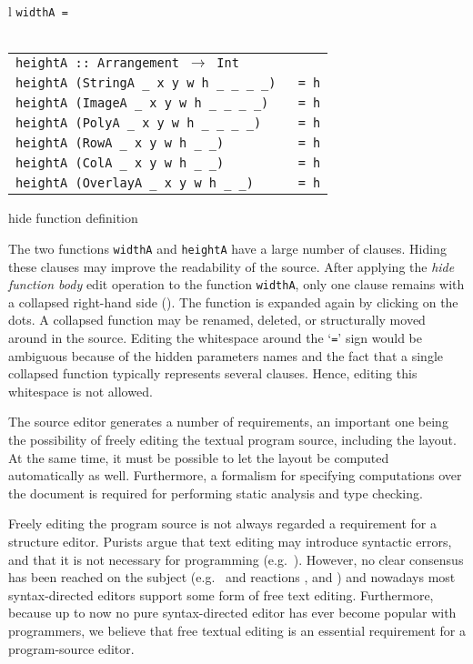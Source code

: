 \documentclass{speauth}
\newcommand{\p}[1]{\texttt{#1}}
\begin{document}
{\begin{tabular}[t]{l}
{\tt widthA = \framebox{\rule{0cm}{1.5ex}\dots}}\\
\\
\begin{tabular}[t]{@{}l@{}l}
{\tt heightA :: Arrangement $\rightarrow$ Int}\\
{\tt heightA (StringA \_ x y w h \_ \_ \_ \_)}&\p{ = h}\\
{\tt heightA (ImageA \_ x y w h \_ \_ \_ \_)}&\p{ = h}\\
{\tt heightA (PolyA \_ x y w h \_ \_ \_ \_)}&\p{ = h}\\
{\tt heightA (RowA \_ x y w h \_ \_)}&\p{ = h}\\
{\tt heightA (ColA \_ x y w h \_ \_)}&\p{ = h}\\
{\tt heightA (OverlayA \_ x y w h \_ \_)}&\p{ = h}
\end{tabular}
\end{tabular}
}{\small hide function definition}

The two functions \verb|widthA| and \verb|heightA| have a large number of clauses. Hiding these clauses may improve the readability of the source. After applying the {\em hide function body} edit operation to the function \verb|widthA|,  only one clause remains with a collapsed right-hand side (\hspace{0.5pt}{\tt \framebox{\rule{0cm}{1.5ex}\dots}}\hspace{0.5pt}). The function is expanded again by clicking on the dots. A collapsed function may be renamed, deleted, or structurally moved around in the source. Editing the whitespace around the `\verb|=|' sign would be ambiguous because of the hidden parameters names and the fact that a single collapsed function typically represents several clauses. Hence, editing this whitespace is not allowed.


The source editor generates a number of requirements, an important one being the possibility of freely editing the textual program source, including the layout. At the same time, it must be possible to let the layout be computed automatically as well. Furthermore, a formalism for specifying computations over the document is required for performing static analysis and type checking.

Freely editing the program source is not always regarded a requirement for a structure editor. Purists argue that text editing may introduce syntactic errors, and that it is not necessary for programming (e.g.~\cite{teitelbaum81progSynth,magnusson90orm}). However, no clear consensus has been reached on the subject (e.g.~\cite{abandonText82waters} and reactions \cite{shani83notAbandon,responseToWaters83notkin}, and \cite{vanter94practical}) and nowadays most syntax-directed editors support some form of free text editing. Furthermore, because up to now no pure syntax-directed editor has ever become popular with programmers, we believe that free textual editing is an essential requirement for a program-source editor.
\end{document}
